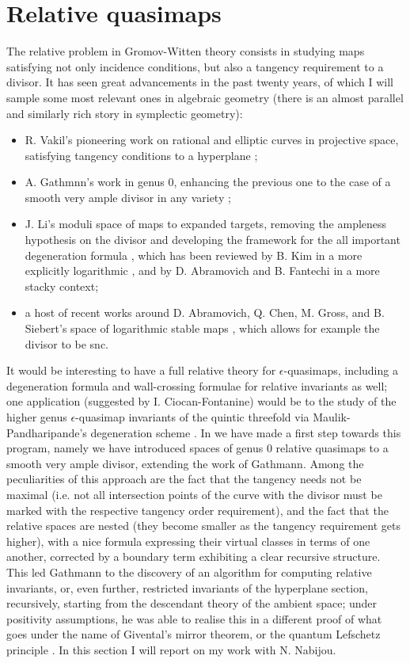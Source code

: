 \section{Relative quasimaps}
The relative problem in Gromov-Witten theory consists in studying maps satisfying not only incidence conditions, but also a tangency requirement to a divisor. It has seen great advancements in the past twenty years, of which I will sample some most relevant ones in algebraic geometry (there is an almost parallel and similarly rich story in symplectic geometry):
\begin{itemize}
 \item R. Vakil's pioneering work on rational and elliptic curves in projective space, satisfying tangency conditions to a hyperplane \cite{Vre};
 \item A. Gathmnn's work in genus $0$, enhancing the previous one to the case of a smooth very ample divisor in any variety \cite{Ga};
 \item J. Li's moduli space of maps to expanded targets, removing the ampleness hypothesis on the divisor and developing the framework for the all important degeneration formula \cite{Li1,Li2}, which has been reviewed by B. Kim in a more explicitly logarithmic \cite{KimLog}, and by D. Abramovich and B. Fantechi in a more stacky \cite{AbramovichFantechi} context;
 \item a host of recent works around D. Abramovich, Q. Chen, M. Gross, and B. Siebert's space of logarithmic stable maps \cite{ChenLog,AbramovichChenLog,GrossSiebertLog}, which allows for example the divisor to be snc.
\end{itemize}
It would be interesting to have a full relative theory for $\epsilon$-quasimaps, including a degeneration formula and wall-crossing formulae for relative invariants as well; one application (suggested by I. Ciocan-Fontanine) would be to the study of the higher genus $\epsilon$-quasimap invariants of the quintic threefold via Maulik-Pandharipande's degeneration scheme \cite{MauPan}. In \cite{BN} we have made a first step towards this program, namely we have introduced spaces of genus $0$ relative quasimaps to a smooth very ample divisor, extending the work of Gathmann. Among the peculiarities of this approach are the fact that the tangency needs not be maximal (i.e. not all intersection points of the curve with the divisor must be marked with the respective tangency order requirement), and the fact that the relative spaces are nested (they become smaller as the tangency requirement gets higher), with a nice formula expressing their virtual classes in terms of one another, corrected by a boundary term exhibiting a clear recursive structure. This led Gathmann to the discovery of an algorithm for computing relative invariants, or, even further, restricted invariants of the hyperplane section, recursively, starting from the descendant theory of the ambient space; under positivity assumptions, he was able to realise this in a different proof of what goes under the name of Givental's mirror theorem, or the quantum Lefschetz principle \cite{Ga-MF}. In this section I will report on my work with N. Nabijou.

